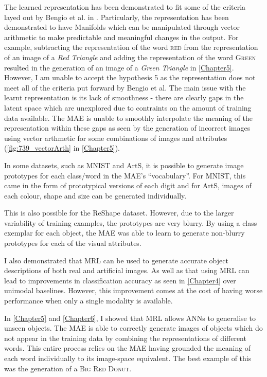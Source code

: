 The learned representation has been demonstrated to fit some of the criteria layed out by Bengio et al. in \cite{repRev}. Particularly, the representation has been demonstrated to have Manifolds which can be manipulated through vector arithmetic to make predictable and meaningful changes in the output. For example, subtracting the representation of the word \textsc{red} from the representation of an image of a \textit{Red Triangle} and adding the representation of the word \textsc{Green} resulted in the generation of an image of a \textit{Green Triangle} in \autoref{Chapter5}. However, I am unable to accept the hypothesis 5 as the representation does not meet all of the criteria put forward by Bengio et al. The main issue with the learnt representation is its lack of smoothness - there are clearly gaps in the latent space which are unexplored due to contraints on the amount of training data available. The \ac{MAE} is unable to smoothly interpolate the meaning of the representation within these gaps as seen by the generation of incorrect images using vector arthmetic for some combinations of images and attributes (\autoref{fig:739_vectorArth} in \autoref{Chapter5}).

In some datasets, such as MNIST and ArtS, it is possible to generate image prototypes for each class/word in the \ac{MAE}'s ``vocabulary''. For MNIST, this came in the form of prototypical versions of each digit and for ArtS, images of each colour, shape and size can be generated individually.

This is also possible for the ReShape dataset. However, due to the larger variability of training examples, the prototypes are very blurry. By using a class exemplar for each object, the \ac{MAE} was able to learn to generate non-blurry prototypes for each of the visual attributes.

I also demonstrated that \ac{MRL} can be used to generate accurate object descriptions of both real and artificial images. As well as that using \ac{MRL} can lead to improvements in classification accuracy as seen in \autoref{Chapter4} over unimodal baselines. However, this improvement comes at the cost of having worse performance when only a single modality is available.

In \autoref{Chapter5} and \autoref{Chapter6}, I showed that \ac{MRL} allows \acp{ANN} to generalise to unseen objects. The \ac{MAE} is able to correctly generate images of objects which do not appear in the training data by combining the representations of different words. This entire process relies on the \ac{MAE} having grounded the meaning of each word individually to its image-space equivalent. The best example of this was the generation of a \textsc{Big Red Donut}.

